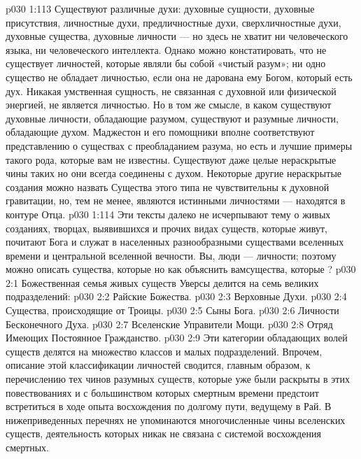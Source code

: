 \vs p030 1:113 Существуют различные духи: духовные сущности, духовные присутствия, личностные духи, предличностные духи, сверхличностные духи, духовные существа, духовные личности --- но здесь не хватит ни человеческого языка, ни человеческого интеллекта. Однако можно констатировать, что не существует личностей, которые являли бы собой «чистый разум»; ни одно существо не обладает личностью, если она не дарована ему Богом, который есть дух. Никакая умственная сущность, не связанная с духовной или физической энергией, не является личностью. Но в том же смысле, в каком существуют духовные личности, обладающие разумом, существуют и разумные личности, обладающие духом. Маджестон и его помощники вполне соответствуют представлению о существах с преобладанием разума, но есть и лучшие примеры такого рода, которые вам не известны. Существуют даже целые нераскрытые чины таких  но они всегда соединены с духом. Некоторые другие нераскрытые создания можно назвать  Существа этого типа не чувствительны к духовной гравитации, но, тем не менее, являются истинными личностями --- находятся в контуре Отца.
\vs p030 1:114 \pc Эти тексты далеко не исчерпывают тему о живых созданиях, творцах, выявившихся и прочих видах существ, которые живут, почитают Бога и служат в населенных разнообразными существами вселенных времени и центральной вселенной вечности. Вы, люди --- личности; поэтому можно описать существа, которые  но как объяснить вамсущества, которые  ?
\vs p030 2:1 Божественная семья живых существ Уверсы делится на семь великих подразделений:
\vs p030 2:2 \bibnobreakspace Райские Божества.
\vs p030 2:3 \bibnobreakspace Верховные Духи.
\vs p030 2:4 \bibnobreakspace Существа, происходящие от Троицы.
\vs p030 2:5 \bibnobreakspace Сыны Бога.
\vs p030 2:6 \bibnobreakspace Личности Бесконечного Духа.
\vs p030 2:7 \bibnobreakspace Вселенские Управители Мощи.
\vs p030 2:8 \bibnobreakspace Отряд Имеющих Постоянное Гражданство.
\vs p030 2:9 \pc Эти категории обладающих волей существ делятся на множество классов и малых подразделений. Впрочем, описание этой классификации личностей сводится, главным образом, к перечислению тех чинов разумных существ, которые уже были раскрыты в этих повествованиях и с большинством которых смертным времени предстоит встретиться в ходе опыта восхождения по долгому пути, ведущему в Рай. В нижеприведенных перечнях не упоминаются многочисленные чины вселенских существ, деятельность которых никак не связана с системой восхождения смертных.

